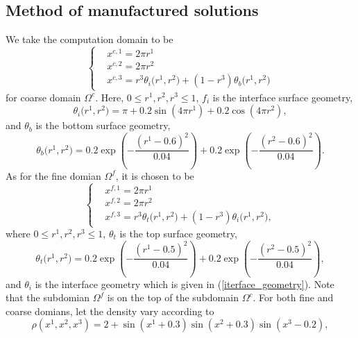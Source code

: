 \subsection{Method of manufactured solutions}\label{manufactured_sol}
We take the computation domain to be 
\begin{equation}\label{coarse_domain_manufactured}
\left\{
\begin{aligned}
& x^{c,1} = 2\pi r^1\\
& x^{c,2} = 2\pi r^2\\
& x^{c,3} = r^3\theta_i\big(r^1,r^2\big) + (1-r^3)\theta_b\big(r^1,r^2\big)
\end{aligned}
\right.
\end{equation}
for coarse domain $\Omega^c$. Here, $0\leq r^1, r^2, r^3\leq 1$, $f_i$ is the interface surface geometry,
\begin{equation}\label{iterface_geometry}
\theta_i\big(r^1,r^2\big) = \pi+0.2\sin(4\pi r^1)+0.2\cos(4\pi r^2),
\end{equation}
and 
$\theta_b$ is the bottom surface geometry,
\begin{equation}\label{bottom_geometry}
\theta_b\big(r^1,r^2\big) = 0.2\exp\left(-\frac{(r^1-0.6)^2}{0.04}\right)+0.2\exp\left(-\frac{(r^2-0.6)^2}{0.04}\right).
\end{equation}
As for the fine domian $\Omega^f$, it is chosen to be
\begin{equation}\label{fine_domain_manufactured}
\left\{
\begin{aligned}
& x^{f,1} = 2\pi r^1\\
& x^{f,2} = 2\pi r^2\\
& x^{f,3} = r^3\theta_t\big(r^1,r^2\big) + (1-r^3)\theta_i\big(r^1,r^2\big),
\end{aligned}
\right.
\end{equation}
where $0\leq r^1, r^2, r^3\leq 1$, $\theta_t$ is the top surface geometry,
\begin{equation}\label{top_geometry}
\theta_t\big(r^1,r^2\big) = 0.2\exp\left(-\frac{(r^1-0.5)^2}{0.04}\right)+0.2\exp\left(-\frac{(r^2-0.5)^2}{0.04}\right),
\end{equation}
and $\theta_i$ is the interface geometry which is given in (\ref{iterface_geometry}). Note that the subdomian 
$\Omega^f$ is on the top of the subdomain $\Omega^c$. For both fine and coarse domians, let the density vary according to
\begin{equation}\label{density_function}
\rho(x^1,x^2,x^3) = 2 + \sin(x^1+0.3)\sin(x^2+0.3)\sin(x^3-0.2),
\end{equation}
